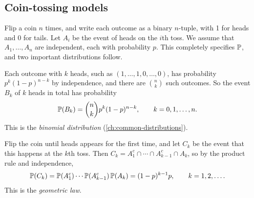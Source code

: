 \subsection{Coin-tossing models}\label{sec:coin-tossing-models}

Flip a coin $n$ times, and write each outcome as a binary $n$-tuple, with 1 for heads and 0 for tails. Let $A_i$ be the event of heads on the $i$th toss. We assume that $A_1, \ldots, A_n$ are independent, each with probability $p$. This completely specifies $\mathbb{P}$, and two important distributions follow.

\begin{example}\label{ex:binomial-law}
Each outcome with $k$ heads, such as $(1, \ldots, 1, 0, \ldots, 0)$, has probability $p^k(1-p)^{n-k}$ by independence, and there are $\binom{n}{k}$ such outcomes. So the event $B_k$ of $k$ heads in total has probability
\[
  \mathbb{P}(B_k) = \binom{n}{k} p^k (1-p)^{n-k}, \qquad k = 0, 1, \ldots, n.
\]
This is the \emph{binomial distribution} (\cref{ch:common-distributions}).
\end{example}

\begin{example}\label{ex:geometric-law}
Flip the coin until heads appears for the first time, and let $C_k$ be the event that this happens at the $k$th toss. Then $C_k = A_1^c \cap \cdots \cap A_{k-1}^c \cap A_k$, so by the product rule and independence,
\[
  \mathbb{P}(C_k) = \mathbb{P}(A_1^c) \cdots \mathbb{P}(A_{k-1}^c)\,\mathbb{P}(A_k) = (1-p)^{k-1} p, \qquad k = 1, 2, \ldots.
\]
This is the \emph{geometric law}.
\end{example}
